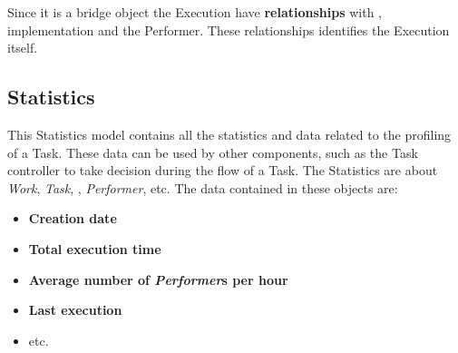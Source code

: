 Since it is a bridge object the Execution have \textbf{relationships} with 
\utask{}, \utask{} implementation and the Performer. These relationships
identifies the Execution itself.



\subsection{Statistics}
This Statistics model contains all the statistics and data related to the profiling
of a Task. These data can be used by other components, such as the Task controller
to take decision during the flow of a Task. The Statistics are about \emph{Work},
\emph{Task}, \emph{\utask{}}, \emph{Performer}, etc. The data contained in these
objects are:
\begin{itemize}
    \item \textbf{Creation date}
    \item \textbf{Total execution time}
    \item \textbf{Average number of \emph{Performer}s per hour}
    \item \textbf{Last execution}
    \item etc.
\end{itemize}
